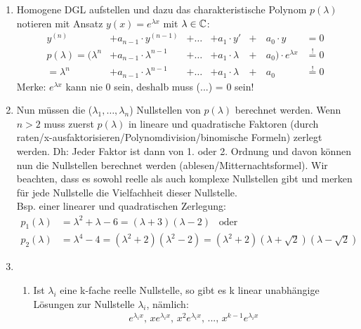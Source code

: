 \begin{enumerate}[leftmargin=0.5cm]
	\item Homogene DGL aufstellen und dazu das charakteristische Polynom $p(\lambda)$ notieren mit Ansatz $y(x) = e^{\lambda x}$ mit $\lambda \in \mathbb{C}$:
	\begin{align*}
		y^{(n)} &+ a_{n-1} \cdot y^{(n-1)} &+ \ldots &+ a_1 \cdot y' &+& \, a_0 \cdot y&=0\\
		p(\lambda) = (\lambda^n &+ a_{n-1} \cdot \lambda^{n-1} &+ \ldots &+ a_1 \cdot \lambda &+& \, a_0) \cdot e^{\lambda x} &\overset{!}{=} 0 \\
		= \lambda^n &+ a_{n-1} \cdot \lambda^{n-1} &+ \ldots &+ a_1 \cdot \lambda &+& \, a_0 &\overset{!}{=} 0
	\end{align*}
	Merke: $e^{\lambda x}$ kann nie 0 sein, deshalb muss (...) = 0 sein!

	\item Nun müssen die ($\lambda_1, \ldots, \lambda_n$) Nullstellen von $p(\lambda)$ berechnet werden. Wenn $n > 2$ muss zuerst $p(\lambda)$ in lineare und quadratische Faktoren (durch raten/x-ausfaktorisieren/Polynomdivision/binomische Formeln) zerlegt werden. Dh: Jeder Faktor ist dann von 1. oder 2. Ordnung und davon können nun die Nullstellen berechnet werden (ablesen/Mitternachtsformel). Wir beachten, dass es sowohl reelle als auch komplexe Nullstellen gibt und merken für jede Nullstelle die Vielfachheit dieser Nullstelle.\\
	Bsp. einer linearer und quadratischen Zerlegung:
	{\small\vspace{-0.2cm} \begin{align*}
			p_1(\lambda) &= \lambda^2 + \lambda - 6 = (\lambda + 3) (\lambda - 2) \hspace{10pt} \text{oder} \\
			p_2(\lambda) &= \lambda^4 -4 = (\lambda^2 + 2) (\lambda^2 - 2) = (\lambda^2 + 2) (\lambda + \sqrt{2}) (\lambda - \sqrt{2})
	\end{align*}}
	\item 
	\begin{enumerate}[leftmargin=0.3cm]
		\item Ist $\lambda_i$ eine k-fache reelle Nullstelle, so gibt es k linear unabhängige Lösungen zur Nullstelle $\lambda_i$, nämlich:
		\vspace{3pt}
		\begin{align*}
			e^{\lambda_i x}, \, x e^{\lambda_i x}, \, x^2 e^{\lambda_i x}, \, ... , \, x^{k-1} e^{\lambda_i x}
		\end{align*}


\end{enumerate}
\end{enumerate}
